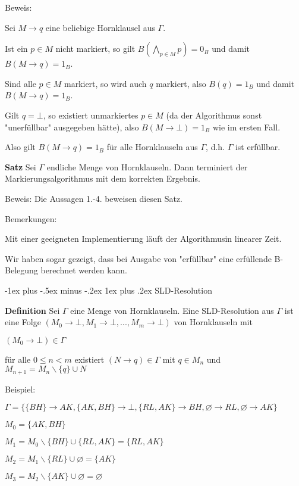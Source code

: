 \documentclass[a4paper]{article}
\makeatletter
\renewcommand{\note}[2]{\begin{noteBox} \textbf{#1} #2 \end{noteBox}}
\renewcommand{\subsubsection}{\@startsection{subsubsection}{3}{0mm}%
                {-1ex plus -.5ex minus -.2ex}%
                {1ex plus .2ex}%
                {\normalfont\small\bfseries}}
\makeatother
\begin{document}
\begin{multicols}{3}
\begin{enumerate*}
    Beweis:
    \begin{itemize*}
      \item Sei $M\rightarrow q$ eine beliebige Hornklausel aus $\Gamma$.
      \item Ist ein $p\in M$ nicht markiert, so gilt $B(\bigwedge_{p\in M} p) = 0_B$ und damit $B(M\rightarrow q) = 1_B$.
      \item Sind alle $p\in M$ markiert, so wird auch $q$ markiert, also $B(q) = 1_B$ und damit $B(M\rightarrow q) = 1_B$.
      \item Gilt $q=\bot$, so existiert unmarkiertes $p\in M$ (da der Algorithmus sonst "unerfüllbar" ausgegeben hätte), also $B(M\rightarrow\bot) = 1_B$ wie im ersten Fall.
    \end{itemize*}
    Also gilt $B(M\rightarrow q) = 1_B$ für alle Hornklauseln aus $\Gamma$, d.h. $\Gamma$ ist erfüllbar.
  \end{enumerate*}

  \note{Satz}{Sei $\Gamma$ endliche Menge von Hornklauseln. Dann terminiert der Markierungsalgorithmus mit dem korrekten Ergebnis.}

  Beweis: Die Aussagen 1.-4. beweisen diesen Satz.

  Bemerkungen:
  \begin{itemize*}
    \item Mit einer geeigneten Implementierung läuft der Algorithmusin linearer Zeit.
    \item Wir haben sogar gezeigt, dass bei Ausgabe von "erfüllbar" eine erfüllende B-Belegung berechnet werden kann.
  \end{itemize*}

  \subsubsection{SLD-Resolution}
  \note{Definition}{Sei $\Gamma$ eine Menge von Hornklauseln. Eine SLD-Resolution aus $\Gamma$ ist eine Folge $(M_0\rightarrow\bot,M_1\rightarrow\bot,... ,M_m\rightarrow\bot)$ von Hornklauseln mit
    \begin{itemize*}
      \item $(M_0\rightarrow\bot)\in\Gamma$
      \item für alle $0\leq n<m$ existiert $(N\rightarrow q)\in\Gamma$ mit $q\in M_n$ und $M_{n+1} = M_n\backslash\{q\}\cup N$
    \end{itemize*}
  }

  Beispiel:
  \begin{itemize*}
    \item $\Gamma =\{\{BH\}\rightarrow AK,\{AK,BH\}\rightarrow\bot,\{RL,AK\}\rightarrow BH,\varnothing\rightarrow RL,\varnothing\rightarrow AK\}$
    \item $M_0 =\{AK,BH\}$
    \item $M_1 =M_0 \backslash\{BH\}\cup\{RL,AK\}=\{RL,AK\}$
    \item $M_2 =M_1 \backslash\{RL\}\cup\varnothing =\{AK\}$
    \item $M_3 =M_2 \backslash\{AK\}\cup\varnothing =\varnothing$
  \end{itemize*}


\end{multicols}
\end{document}
